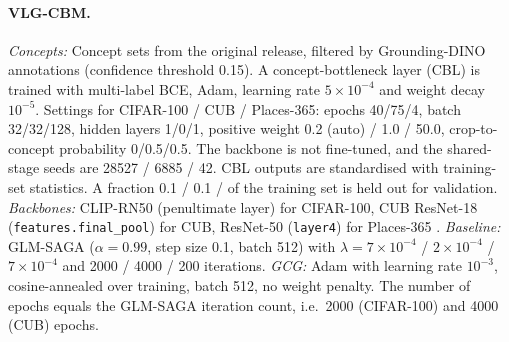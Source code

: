 \paragraph{VLG-CBM.}
\emph{Concepts:} Concept sets from the original release, filtered by Grounding-DINO
annotations (confidence threshold 0.15). A concept-bottleneck layer (CBL) is trained with
multi-label BCE, Adam, learning rate $5\times10^{-4}$ and weight decay $10^{-5}$. Settings for
CIFAR-100 / CUB / Places-365: epochs 40/75/4, batch 32/32/128, hidden layers 1/0/1, positive
weight 0.2 (auto) / 1.0 / 50.0, crop-to-concept probability 0/0.5/0.5. The backbone is not
fine-tuned, and the shared-stage seeds are 28527 / 6885 / 42. CBL outputs are standardised with
training-set statistics. A fraction 0.1 / 0.1 / 
of the training set is held out for validation.
\emph{Backbones:} CLIP-RN50 (penultimate layer) for CIFAR-100, CUB ResNet-18
(\texttt{features.final\_pool}) for CUB, ResNet-50 (\texttt{layer4}) for Places-365
.
\emph{Baseline:} GLM-SAGA ($\alpha=0.99$, step size 0.1, batch 512) with
$\lambda=7\times10^{-4}$ / $2\times10^{-4}$ / $7\times10^{-4}$ and 2000 / 4000 / 200
iterations.
\emph{GCG:} Adam with learning rate $10^{-3}$, cosine-annealed over training, batch 512, no
weight penalty. The number of epochs equals the GLM-SAGA iteration count, i.e.\ 2000
(CIFAR-100) and 4000 (CUB) epochs.

